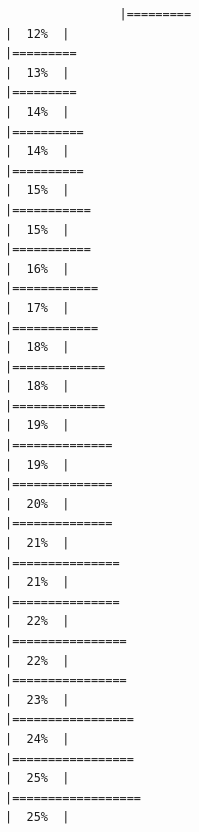 \documentclass[
]{article}
\begin{document}
\begin{verbatim}
                |=========                                                             |  12%  |                                                                              |=========                                                             |  13%  |                                                                              |=========                                                             |  14%  |                                                                              |==========                                                            |  14%  |                                                                              |==========                                                            |  15%  |                                                                              |===========                                                           |  15%  |                                                                              |===========                                                           |  16%  |                                                                              |============                                                          |  17%  |                                                                              |============                                                          |  18%  |                                                                              |=============                                                         |  18%  |                                                                              |=============                                                         |  19%  |                                                                              |==============                                                        |  19%  |                                                                              |==============                                                        |  20%  |                                                                              |==============                                                        |  21%  |                                                                              |===============                                                       |  21%  |                                                                              |===============                                                       |  22%  |                                                                              |================                                                      |  22%  |                                                                              |================                                                      |  23%  |                                                                              |=================                                                     |  24%  |                                                                              |=================                                                     |  25%  |                                                                              |==================                                                    |  25%  |                                                               
\end{verbatim}
\end{document}
